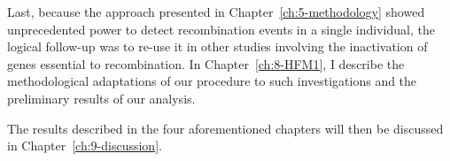 Last, because the approach presented in Chapter~\ref{ch:5-methodology} showed unprecedented power to detect recombination events in a single individual, the logical follow-up was to re-use it in other studies involving the inactivation of genes essential to recombination.
In Chapter~\ref{ch:8-HFM1}, I describe the methodological adaptations of our procedure to such investigations and the preliminary results of our analysis.

The results described in the four aforementioned chapters will then be discussed in Chapter~\ref{ch:9-discussion}.



